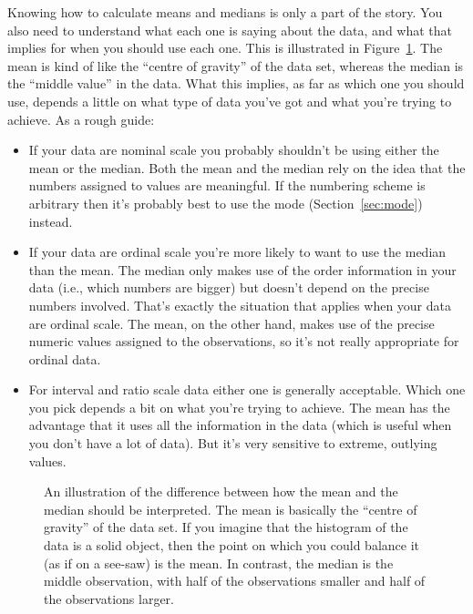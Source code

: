 
Knowing how to calculate means and medians is only a part of the story. You also need to understand what each one is saying about the data, and what that implies for when you should use each one. This is illustrated in Figure~\ref{fig:meanmedian}. The mean is kind of like the ``centre of gravity'' of the data set, whereas the median is the ``middle value'' in the data. What this implies, as far as which one you should use, depends a little on what type of data you've got and what you're trying to achieve. As a rough guide:
\begin{itemize} 
\item If your data are nominal scale you probably shouldn't be using either the mean or the median. Both the mean and the median rely on the idea that the numbers assigned to values are meaningful. If the numbering scheme is arbitrary then it's probably best to use the mode (Section~\ref{sec:mode}) instead. 
\item If your data are ordinal scale you're more likely to want to use the median than the mean. The median only makes use of the order information in your data (i.e., which numbers are bigger) but doesn't depend on the precise numbers involved. That's exactly the situation that applies when your data are ordinal scale. The mean, on the other hand, makes use of the precise numeric values assigned to the observations, so it's not really appropriate for ordinal data.
\item For interval and ratio scale data either one is generally acceptable. Which one you pick depends a bit on what you're trying to achieve. The mean has the advantage that it uses all the information in the data (which is useful when you don't have a lot of data). But it's very sensitive to extreme, outlying  values.  
\end{itemize}


\vspace{0.5cm}
\begin{figure}[htb]
\begin{center}
\caption{An illustration of the difference between how the mean and the median should be interpreted. The mean is basically the ``centre of gravity'' of the data set. If you imagine that the histogram of the data is a solid object, then the point on which you could balance it (as if on a see-saw) is the mean. In contrast, the median is the middle observation, with half of the observations smaller and half of the observations larger.}
\HR
\label{fig:meanmedian}
\end{center}
\end{figure}

